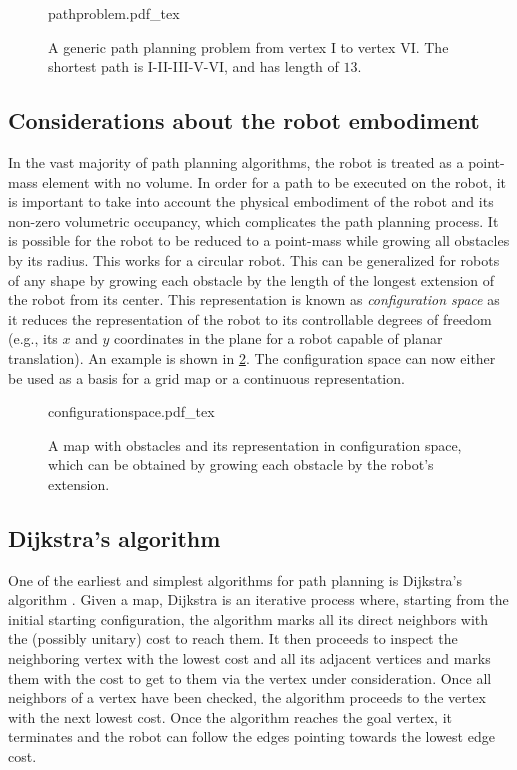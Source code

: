\begin{figure}[!htb]
    \centering
    \def\svgwidth{0.6\textwidth}
    {pathproblem.pdf_tex}
    \caption{A generic path planning problem from vertex I to vertex VI. The shortest path is I-II-III-V-VI, and has length of $13$. \label{fig:pathproblem}}
\end{figure}

\subsection{Considerations about the robot embodiment}

In the vast majority of path planning algorithms, the robot is treated as a point-mass element with no volume. In order for a path to be executed on the robot, it is important to take into account the physical embodiment of the robot and its non-zero volumetric occupancy, which complicates the path planning process.
It is possible for the robot to be reduced to a point-mass while growing all obstacles by its radius. This works for a circular robot. This can be generalized for robots of any shape by growing each obstacle by the length of the longest extension of the robot from its center. This representation is known as \textsl{configuration space} as it reduces the representation of the robot to its controllable degrees of freedom (e.g., its $x$ and $y$ coordinates in the plane for a robot capable of planar translation). An example is shown in \cref{fig:cspace}. The configuration space can now either be used as a basis for a grid map or a continuous representation.

\begin{figure}[!htb]
    \centering
    \def\svgwidth{0.9\textwidth}
    {configurationspace.pdf_tex}
    \caption{A map with obstacles and its representation in configuration space, which can be obtained by growing each obstacle by the robot's extension. \label{fig:cspace}}
\end{figure}

\subsection{Dijkstra's algorithm}

One of the earliest and simplest algorithms for path planning is Dijkstra's algorithm \cite{dijkstra1959note}. Given a map, Dijkstra is an iterative process where, starting from the initial starting configuration, the algorithm marks all its direct neighbors with the (possibly unitary) cost to reach them. It then proceeds to inspect the neighboring vertex with the lowest cost and all its adjacent vertices and marks them with the cost to get to them via the vertex under consideration. Once all neighbors of a vertex have been checked, the algorithm proceeds to the vertex with the next lowest cost. Once the algorithm reaches the goal vertex, it terminates and the robot can follow the edges pointing towards the lowest edge cost.

